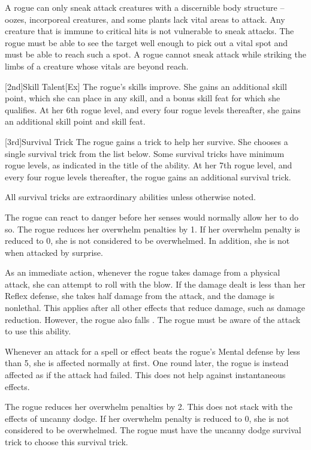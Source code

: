 A rogue can only sneak attack creatures with a discernible body structure -- oozes, incorporeal creatures, and some plants lack vital areas to attack.
Any creature that is immune to critical hits is not vulnerable to sneak attacks.
The rogue must be able to see the target well enough to pick out a vital spot and must be able to reach such a spot.
A rogue cannot sneak attack while striking the limbs of a creature whose vitals are beyond reach.

[2nd]{Skill Talent}[Ex]
The rogue's skills improve.
She gains an additional skill point, which she can place in any skill, and a bonus skill feat for which she qualifies.
At her 6th rogue level, and every four rogue levels thereafter, she gains an additional skill point and skill feat.

[3rd]{Survival Trick}
The rogue gains a trick to help her survive.
She chooses a single survival trick from the list below.
Some survival tricks have minimum rogue levels, as indicated in the title of the ability.
At her 7th rogue level, and every four rogue levels thereafter, the rogue gains an additional survival trick.

All survival tricks are extraordinary abilities unless otherwise noted.

The rogue can react to danger before her senses would normally allow her to do so.
The rogue reduces her overwhelm penalties by 1.
If her overwhelm penalty is reduced to 0, she is not considered to be overwhelmed.
In addition, she is not \unaware when attacked by surprise.

As an immediate action, whenever the rogue takes damage from a physical attack, she can attempt to roll with the blow.
If the damage dealt is less than her Reflex defense, she takes half damage from the attack, and the damage is nonlethal.
This applies after all other effects that reduce damage, such as damage reduction.
However, the rogue also falls \prone.
The rogue must be aware of the attack to use this ability.

Whenever an attack for a  spell or effect beats the rogue's Mental defense by less than 5, she is affected normally at first.
One round later, the rogue is instead affected as if the attack had failed.
This does not help against instantaneous effects.

The rogue reduces her overwhelm penalties by 2.
This does not stack with the effects of uncanny dodge.
If her overwhelm penalty is reduced to 0, she is not considered to be overwhelmed.
The rogue must have the uncanny dodge survival trick to choose this survival trick.

